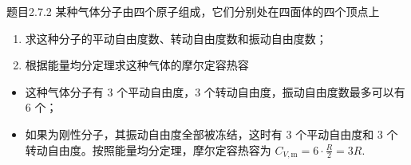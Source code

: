 \begin{question}{题目2.7.2}
    某种气体分子由四个原子组成，它们分别处在四面体的四个顶点上
    \begin{enumerate}
        \item[(1)] 求这种分子的平动自由度数、转动自由度数和振动自由度数；
        \item[(2)] 根据能量均分定理求这种气体的摩尔定容热容
    \end{enumerate}
\end{question}

\begin{solution}
    \begin{itemize}
        \item[(1)] 这种气体分子有 $3$ 个平动自由度，$3$ 个转动自由度，振动自由度数最多可以有 $6$ 个；
        \item[(2)] 如果为刚性分子，其振动自由度全部被冻结，这时有 $3$ 个平动自由度和 $3$ 个转动自由度。按照能量均分定理，摩尔定容热容为 $C_{V,\mathrm{m}} = 6 \cdot \frac{R}{2} = 3R$.
    \end{itemize}
\end{solution}